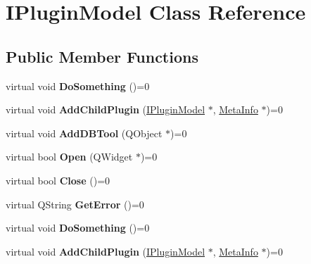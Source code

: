 \hypertarget{class_i_plugin_model}{}\section{I\+Plugin\+Model Class Reference}
\label{class_i_plugin_model}
\subsection*{Public Member Functions}
\begin{DoxyCompactItemize}
\item 
virtual void {\bfseries Do\+Something} ()=0\hypertarget{class_i_plugin_model_a377627e683f892ffda2c6225d975251b}{}\label{class_i_plugin_model_a377627e683f892ffda2c6225d975251b}

\item 
virtual void {\bfseries Add\+Child\+Plugin} (\hyperlink{class_i_plugin_model}{I\+Plugin\+Model} $\ast$, \hyperlink{struct_meta_info}{Meta\+Info} $\ast$)=0\hypertarget{class_i_plugin_model_aff406b0571f6dc77488c315e0df0f563}{}\label{class_i_plugin_model_aff406b0571f6dc77488c315e0df0f563}

\item 
virtual void {\bfseries Add\+D\+B\+Tool} (Q\+Object $\ast$)=0\hypertarget{class_i_plugin_model_a2db1262756c4a587fd6cd2d7191841fb}{}\label{class_i_plugin_model_a2db1262756c4a587fd6cd2d7191841fb}

\item 
virtual bool {\bfseries Open} (Q\+Widget $\ast$)=0\hypertarget{class_i_plugin_model_ac1c51202f69db707ca56e8f3c78ce163}{}\label{class_i_plugin_model_ac1c51202f69db707ca56e8f3c78ce163}

\item 
virtual bool {\bfseries Close} ()=0\hypertarget{class_i_plugin_model_a3f9ce2298f73283fec68fc908db14e57}{}\label{class_i_plugin_model_a3f9ce2298f73283fec68fc908db14e57}

\item 
virtual Q\+String {\bfseries Get\+Error} ()=0\hypertarget{class_i_plugin_model_ad42778c15ce3e8fdb9524a6dfd61792a}{}\label{class_i_plugin_model_ad42778c15ce3e8fdb9524a6dfd61792a}

\item 
virtual void {\bfseries Do\+Something} ()=0\hypertarget{class_i_plugin_model_a377627e683f892ffda2c6225d975251b}{}\label{class_i_plugin_model_a377627e683f892ffda2c6225d975251b}

\item 
virtual void {\bfseries Add\+Child\+Plugin} (\hyperlink{class_i_plugin_model}{I\+Plugin\+Model} $\ast$, \hyperlink{struct_meta_info}{Meta\+Info} $\ast$)=0\hypertarget{class_i_plugin_model_aff406b0571f6dc77488c315e0df0f563}{}\label{class_i_plugin_model_aff406b0571f6dc77488c315e0df0f563}


\end{DoxyCompactItemize}
